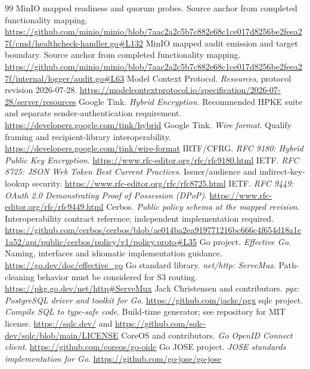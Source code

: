 \begin{thebibliography}{99}
 MinIO mapped readiness and quorum probes. Source anchor from completed functionality mapping. \url{https://github.com/minio/minio/blob/7aac2a2c5b7c882e68c1ce017d8256be2feea27f/cmd/healthcheck-handler.go#L132}
 MinIO mapped audit emission and target boundary. Source anchor from completed functionality mapping. \url{https://github.com/minio/minio/blob/7aac2a2c5b7c882e68c1ce017d8256be2feea27f/internal/logger/audit.go#L63}
 Model Context Protocol. \emph{Resources}, protocol revision 2026-07-28. \url{https://modelcontextprotocol.io/specification/2026-07-28/server/resources}
 Google Tink. \emph{Hybrid Encryption}. Recommended HPKE suite and separate sender-authentication requirement. \url{https://developers.google.com/tink/hybrid}
 Google Tink. \emph{Wire format}. Qualify framing and recipient-library interoperability. \url{https://developers.google.com/tink/wire-format}
 IRTF/CFRG. \emph{RFC 9180: Hybrid Public Key Encryption}. \url{https://www.rfc-editor.org/rfc/rfc9180.html}
 IETF. \emph{RFC 8725: JSON Web Token Best Current Practices}. Issuer/audience and indirect-key-lookup security. \url{https://www.rfc-editor.org/rfc/rfc8725.html}
 IETF. \emph{RFC 9449: OAuth 2.0 Demonstrating Proof of Possession (DPoP)}. \url{https://www.rfc-editor.org/rfc/rfc9449.html}
 Cerbos. \emph{Public policy schema at the mapped revision}. Interoperability contract reference; independent implementation required. \url{https://github.com/cerbos/cerbos/blob/ae014ba2ea919771216bc666c4f654d18a1c1a52/api/public/cerbos/policy/v1/policy.proto#L35}
 Go project. \emph{Effective Go}. Naming, interfaces and idiomatic implementation guidance. \url{https://go.dev/doc/effective_go}
 Go standard library. \emph{net/http: ServeMux}. Path-cleaning behavior must be considered for S3 routing. \url{https://pkg.go.dev/net/http#ServeMux}
 Jack Christensen and contributors. \emph{pgx: PostgreSQL driver and toolkit for Go}. \url{https://github.com/jackc/pgx}
 sqlc project. \emph{Compile SQL to type-safe code}. Build-time generator; see repository for MIT license. \url{https://sqlc.dev/} and \url{https://github.com/sqlc-dev/sqlc/blob/main/LICENSE}
 CoreOS and contributors. \emph{Go OpenID Connect client}. \url{https://github.com/coreos/go-oidc}
 Go JOSE project. \emph{JOSE standards implementation for Go}. \url{https://github.com/go-jose/go-jose}

\end{thebibliography}
